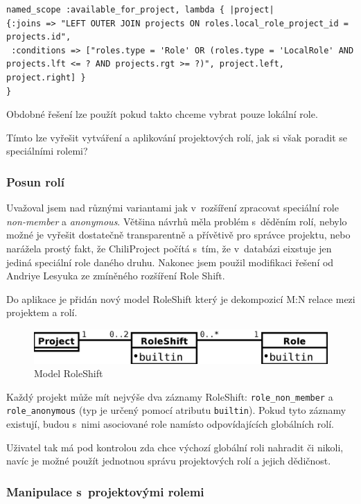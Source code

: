 \documentclass[thesis=B,czech]{FITthesis}[2012/05/02]
\begin{document}
\begin{lstlisting}
named_scope :available_for_project, lambda { |project|
{:joins => "LEFT OUTER JOIN projects ON roles.local_role_project_id = projects.id",
 :conditions => ["roles.type = 'Role' OR (roles.type = 'LocalRole' AND projects.lft <= ? AND projects.rgt >= ?)", project.left, project.right] }
}
\end{lstlisting}
Obdobné řešení lze použít pokud takto chceme vybrat pouze lokální role.

Tímto lze vyřešit vytváření a aplikování projektových rolí, jak si však
poradit se speciálními rolemi?

\subsubsection{Posun rolí}

Uvažoval jsem nad různými variantami jak v~rozšíření zpracovat speciální
role \emph{non-member} a \emph{anonymous}. Většina návrhů měla problém
s~děděním rolí, nebylo možné je vyřešit dostatečně transparentně a
přívětivě pro správce projektu, nebo narážela prostý fakt, že
ChiliProject počítá s~tím, že v~databázi eixstuje jen jediná speciální
role daného druhu. Nakonec jsem použil modifikaci řešení od Andriye
Lesyuka ze zmíněného rozšíření Role Shift.

Do aplikace je přidán nový model RoleShift který je dekompozicí M:N
relace mezi projektem a rolí.

\begin{figure}[htbp]
\centering
\includegraphics[width=1\textwidth]{role-er2.pdf}
\caption{Model RoleShift}
\end{figure}

Každý projekt může mít nejvýše dva záznamy RoleShift:
\lstinline!role_non_member! a \lstinline!role_anonymous! (typ je určený
pomocí atributu \lstinline!builtin!). Pokud tyto záznamy existují, budou
s~nimi asociované role namísto odpovídajících globálních rolí.

Uživatel tak má pod kontrolou zda chce výchozí globální roli nahradit či
nikoli, navíc je možné použít jednotnou správu projektových rolí a
jejich dědičnost.

\subsubsection{Manipulace s~projektovými rolemi}
\end{document}
